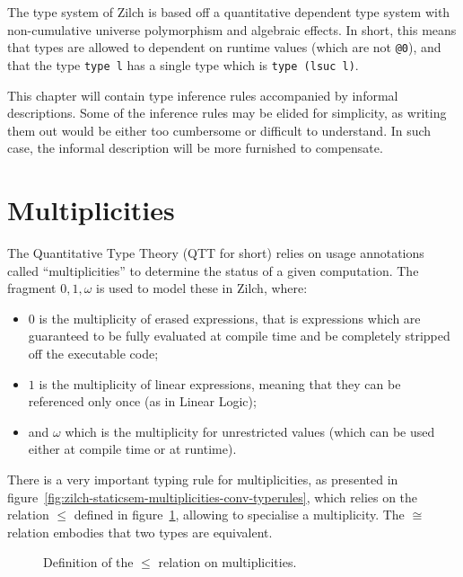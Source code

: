 The type system of Zilch is based off a quantitative dependent type system with non-cumulative universe polymorphism and algebraic effects.
In short, this means that types are allowed to dependent on runtime values (which are not \texttt{@0}), and that the type \texttt{type l} has a single type which is \texttt{type (lsuc l)}.

This chapter will contain type inference rules accompanied by informal descriptions.
Some of the inference rules may be elided for simplicity, as writing them out would be either too cumbersome or difficult to understand.
In such case, the informal description will be more furnished to compensate.

\section{Multiplicities}\label{sec:zilch-staticsem-multiplicities}

The Quantitative Type Theory (QTT for short) relies on usage annotations called ``multiplicities'' to determine the status of a given computation.
The fragment $0,1,\omega$ is used to model these in Zilch, where:
\begin{itemize}
	\item $0$ is the multiplicity of erased expressions, that is expressions which are guaranteed to be fully evaluated at compile time and be completely stripped off the executable code;
	\item $1$ is the multiplicity of linear expressions, meaning that they can be referenced only once (as in Linear Logic);
	\item and $\omega$ which is the multiplicity for unrestricted values (which can be used either at compile time or at runtime).
\end{itemize}

There is a very important typing rule for multiplicities, as presented in figure~\ref{fig:zilch-staticsem-multiplicities-conv-typerules}, which relies on the relation $\leqslant$ defined in figure~\ref{fig:zilch-staticsem-multiplicities-partialorder}, allowing to specialise a multiplicity.
The $\cong$ relation embodies that two types are equivalent.

\begin{figure}[H]

	\caption{Definition of the $\leqslant$ relation on multiplicities.}
	\label{fig:zilch-staticsem-multiplicities-partialorder}
\end{figure}

